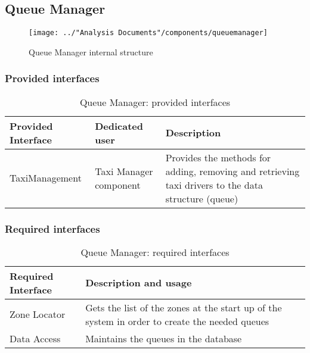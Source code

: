 \subsection{Queue Manager}
\begin{figure}[H]
	\centering
	\texttt{[image: ../"Analysis Documents"/components/queuemanager]}
	\label{fig:queuemanager}
	\caption{Queue Manager internal structure}
\end{figure}
\subsubsection{Provided interfaces}
\begin{table}[H]
	\begin{longtable}{| p{} | p{} | p{} |}
		\hline
		\textbf{Provided Interface} & \textbf{Dedicated user} & \textbf{Description} \\ \hline
		TaxiManagement & Taxi Manager component & Provides the methods for adding, removing and retrieving taxi drivers to the data structure (queue) \\ \hline
	\end{longtable}
	\caption{Queue Manager: provided interfaces}
	\label{tab:queuemanager:providedInterfaces}
\end{table}
\subsubsection{Required interfaces}
\begin{table}[H]
	\begin{longtable}{| l | p{} |}
		\hline
		\textbf{Required Interface} & \textbf{Description and usage} \\ \hline
		Zone Locator & Gets the list of the zones at the start up of the system in order to create the needed queues \\ \hline
		Data Access & Maintains the queues in the database \\ \hline
	\end{longtable}
	\caption{Queue Manager: required interfaces}
	\label{tab:queuemanager:requiredInterfaces}
\end{table}
